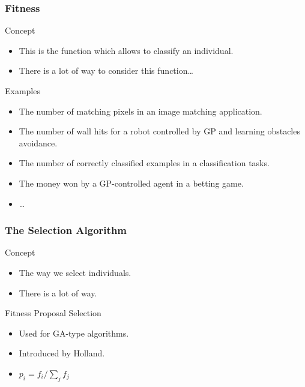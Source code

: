 \begin{frame}
  \frametitle{Fitness}
  \begin{block}{Concept}
    \begin{itemize}
    \item This is the function which allows to classify an individual.
    \item There is a lot of way to consider this function\dots
    \end{itemize}
  \end{block}

  \begin{block}{Examples}
    \begin{itemize}
    \item The number of matching pixels in an image matching application.
    \item The number of wall hits for a robot controlled by GP and
      learning obstacles avoidance.
    \item The number of correctly classified examples in a
      classification tasks.
    \item The money won by a GP-controlled agent in a betting game.
    \item \dots
    \end{itemize}
  \end{block}
\end{frame}

\begin{frame}
  \frametitle{The Selection Algorithm}
  \begin{block}{Concept}
    \begin{itemize}
    \item The way we select individuals.
    \item There is a lot of way.
    \end{itemize}
  \end{block}

  \begin{block}{Fitness Proposal Selection}
    \begin{itemize}
    \item Used for GA-type algorithms.
    \item Introduced by Holland\cite{holland1992}.
    \item $p_i = f_i / \sum_{j}f_j$
    \end{itemize}
  \end{block}
\end{frame}

